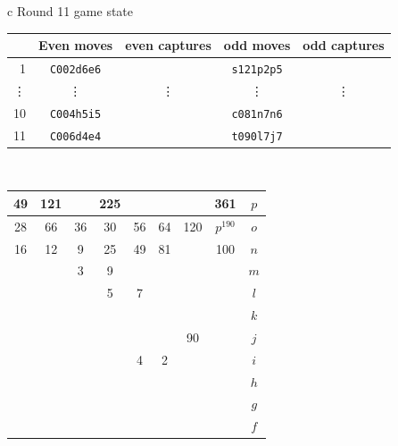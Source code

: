 \documentclass[12pt]{article}
\begin{document}
{\small{
\begin{tabular}{c}
Round 11 game state \\
\begin{tabular}{r|cc|cc}
 & Even moves & even captures    & odd moves & odd captures \\    \hline 
1   &  {\tt C002d6e6} & \quad &  {\tt s121p2p5} & \quad \\
\vdots &  \vdots    & \vdots  & \vdots    & \vdots \\  
10  &  {\tt C004h5i5} & \quad &  {\tt c081n7n6} & \quad \\
11  &  {\tt C006d4e4} & \quad &  {\tt t090l7j7} & \quad \\
\end{tabular}
\\
\begin{tabular}{|c|c|c|c|c|c|c|c||c} \hline
\squadfill{\,}49 & \squadfill{\,}121 & \quad & \squadfill{\,}225 & \quad & \quad & \quad & \squadfill{\,}361 & $p$ \\ \hline
\squadfill{\,}28 & \squadfill{\,}66 & \trianglepafill{\,}36 & \trianglepafill{\,}30 & \trianglepafill{\,}56 & \trianglepafill{\,}64 & \squadfill{\,}120 & \rhombusfill{\,}$p^{190}$ & $o$ \\ \hline
\trianglepafill{\,}16 & \trianglepafill{\,}12 & \circletfill{\,}9 & \circletfill{\,}25 & \circletfill{\,}49 & \circletfill{\,}81 & \quad & \trianglepafill{\,}100 & $n$ \\ \hline
\quad & \quad & \circletfill{\,}3 & \circletfill{\,}9 & \quad & \quad & \quad & \quad & $m$ \\ \hline
\quad & \quad & \quad & \circletfill{\,}5 & \circletfill{\,}7 & \quad & \quad & \quad & $l$ \\ \hline
\quad & \quad & \quad & \quad & \quad & \quad & \quad & \quad & $k$ \\ \hline
\quad & \quad & \quad & \quad & \quad & \quad & \trianglepafill{\,}90 & \quad & $j$ \\ \hline
\quad & \quad & \quad & \quad & \circlet{\,}4 & \circlet{\,}2 & \quad & \quad & $i$ \\ \hline
\quad & \quad & \quad & \quad & \quad & \quad & \quad & \quad & $h$ \\ \hline
\quad & \quad & \quad & \quad & \quad & \quad & \quad & \quad & $g$ \\ \hline
\quad & \quad & \quad & \quad & \quad & \quad & \quad & \quad & $f$ \\ \hline

\end{tabular}
\end{tabular}}}
\end{document}
